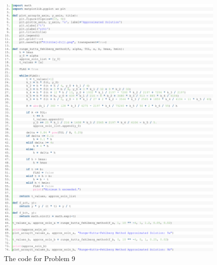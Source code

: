 \documentclass[11pt]{article}
\theoremstyle{break}
\numberwithin{equation}{theorem}
\begin{document}
\begin{center}
    \includegraphics[width=0.85\textwidth]{P9.png}\\
    The code for Problem 9
\end{center}
\end{document}
